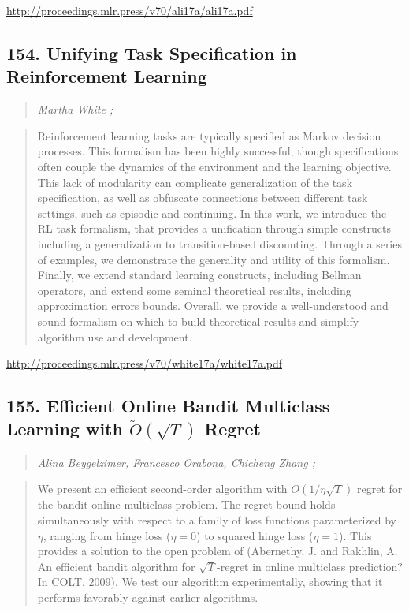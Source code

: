 \documentclass{article}
\begin{document}
\href{http://proceedings.mlr.press/v70/ali17a/ali17a.pdf}{http://proceedings.mlr.press/v70/ali17a/ali17a.pdf}

\subsection{154. Unifying Task Specification in Reinforcement Learning}

\begin{quote}
\footnotesize{\textit{Martha White ;}}
\end{quote}

\begin{quote}
    Reinforcement learning tasks are typically specified as Markov decision processes. This formalism has been highly successful, though specifications often couple the dynamics of the environment and the learning objective. This lack of modularity can complicate generalization of the task specification, as well as obfuscate connections between different task settings, such as episodic and continuing. In this work, we introduce the RL task formalism, that provides a unification through simple constructs including a generalization to transition-based discounting. Through a series of examples, we demonstrate the generality and utility of this formalism. Finally, we extend standard learning constructs, including Bellman operators, and extend some seminal theoretical results, including approximation errors bounds. Overall, we provide a well-understood and sound formalism on which to build theoretical results and simplify algorithm use and development.  \end{quote}

\href{http://proceedings.mlr.press/v70/white17a/white17a.pdf}{http://proceedings.mlr.press/v70/white17a/white17a.pdf}

\subsection{155. Efficient Online Bandit Multiclass Learning with $\tilde{O}(\sqrt{T})$ Regret}

\begin{quote}
\footnotesize{\textit{Alina Beygelzimer, Francesco Orabona, Chicheng Zhang ;}}
\end{quote}

\begin{quote}
    We present an efficient second-order algorithm with $\tilde{O}(1/\eta \sqrt{T})$ regret for the bandit online multiclass problem. The regret bound holds simultaneously with respect to a family of loss functions parameterized by $\eta$, ranging from hinge loss ($\eta=0$) to squared hinge loss ($\eta=1$). This provides a solution to the open problem of (Abernethy, J. and Rakhlin, A. An efficient bandit algorithm for $\sqrt{T}$-regret in online multiclass prediction? In COLT, 2009). We test our algorithm experimentally, showing that it performs favorably against earlier algorithms.  \end{quote}
\end{document}
